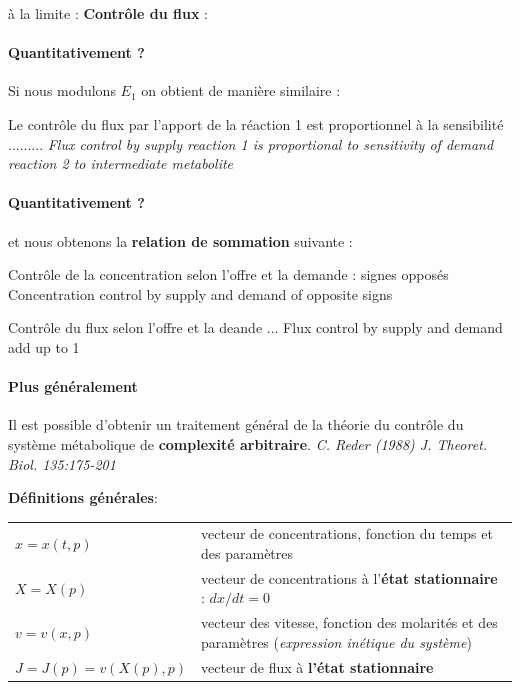 à la limite :
\textbf{Contrôle du flux} : 


\paragraph{Quantitativement ?}
Si nous modulons $E_1$ on obtient de manière similaire :


Le contrôle du flux par l'apport de la réaction 1 est proportionnel à la sensibilité .........
\textit{Flux control by supply reaction 1 is proportional to sensitivity of demand reaction 2 to intermediate metabolite}


\paragraph{Quantitativement ?}
et nous obtenons la \textbf{relation de sommation} suivante : 

Contrôle de la concentration selon l'offre et la demande : signes opposés
Concentration control by supply and demand of opposite signs

Contrôle du flux selon l'offre et la deande ...
Flux control by supply and demand add up to 1


\paragraph{Plus généralement}
Il est possible d'obtenir un traitement général de la théorie du contrôle du système métabolique de \textbf{complexité arbitraire}. \textit{C. Reder (1988) J. Theoret. Biol. 135:175-201} 

\textbf{Définitions générales}:
\begin{tabular}{ll}
	$x = x(t,p)$ 	&	vecteur de concentrations, fonction du temps et des paramètres \\
	$X = X(p)$ 	&	vecteur de concentrations à l'\textbf{état stationnaire} : $dx/dt=0$ \\
	$v=v(x,p)$	&	vecteur des vitesse, fonction des molarités et des paramètres (\textit{expression inétique du système}) \\
	$J=J(p) = v(X(p),p)$	&	vecteur de flux à \textbf{l'état stationnaire}
\end{tabular}


